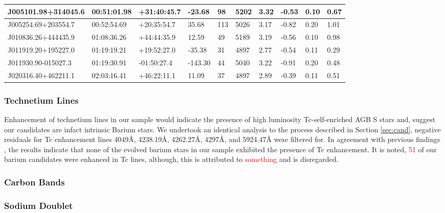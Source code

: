 \documentclass[a4paper,fleqn,usenatbib]{mnras}
\newcommand{\todo}[1]{\textcolor{red}{#1}}
\begin{document}
\begin{table}[]
\begin{tabular}{@{}|l|l|l|l|l|l|l|l|l|l|@{}}
J005101.98+314045.6 & 00:51:01.98 & +31:40:45.7 & -23.68    & 98  & 5202 & 3.32  & -0.53      & 0.10      & 0.67 \\ \midrule
J005254.69+203554.7 & 00:52:54.69 & +20:35:54.7 & 35.68     & 113 & 5026 & 3.17  & -0.82      & 0.20      & 1.01 \\ \midrule
J010836.26+444435.9 & 01:08:36.26 & +44:44:35.9 & 12.59     & 49  & 5189 & 3.19  & -0.56      & 0.10      & 0.98 \\ \midrule
J011919.20+195227.0 & 01:19:19.21 & +19:52:27.0 & -35.38    & 31  & 4897 & 2.77  & -0.54      & 0.11      & 0.29 \\ \midrule
J011930.90-015027.3 & 01:19:30.91 & -01:50:27.4 & -143.30   & 44  & 5040 & 3.22  & -0.91      & 0.20      & 0.48 \\ \midrule
J020316.40+462211.1 & 02:03:16.41 & +46:22:11.1 & 11.09     & 37  & 4897 & 2.89  & -0.39      & 0.11      & 0.51 \\ \bottomrule
\end{tabular}
\end{table}

\subsubsection{Technetium Lines}

Enhancement of technetium lines in our sample would indicate the presence of high luminosity Tc-self-enriched AGB S stars \citep{jorissen1993} and, suggest our candidates are infact intrinsic Barium stars. We undertook an identical analysis to the process described in Section \ref{sec:cand}, negative residuals for Tc enhancement lines 4049\AA, 4238.19\AA, 4262.27\AA, 4297\AA, and 5924.47\AA\hspace{0.2mm} were filtered for. In agreement with previous findings \citep[e.g.][]{little1987,smith1984,smith1983}, the results indicate that none of the evolved barium stars in our sample exhibited the presence of Tc enhancement. It is noted, \todo{51} of our barium candidates were enhanced in Tc lines, although, this is attributed to \todo{something} and is disregarded.

\subsubsection{Carbon Bands}



\subsubsection{Sodium Doublet}
\end{document}
